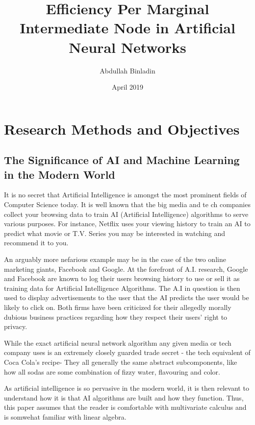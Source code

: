 \documentclass[12pt]{article}
\title{Efficiency Per Marginal Intermediate Node in Artificial Neural Networks}
\author{Abdullah Binladin}
\date{April 2019}
\begin{document}
\maketitle


\section{Research Methods and Objectives}

    \subsection{The Significance of AI and Machine Learning in the Modern World \label{history}}

        It is no secret that Artificial Intelligence is amongst the most prominent fields of Computer Science today. It is well known that the big media and te
        ch companies collect your browsing data to train AI (Artificial Intelligence) algorithms to serve various purposes. For instance, Netflix uses your viewing history to train an AI to predict what movie or T.V. Series you may be interested in watching and recommend it to you.

        An arguably more nefarious example may be in the case of the two online marketing giants, Facebook and Google. At the forefront of A.I. research, Google and Facebook are known to log their users browsing history to use or sell it as training data for Artificial Intelligence Algorithms. The A.I in question is then used to display advertisements to the user that the AI predicts the user would be likely to click on. Both firms have been criticized for their allegedly morally dubious business practices regarding how they respect their users' right to privacy.

        While the exact artificial neural network algorithm any given media or tech company uses is an extremely closely guarded trade secret - the tech equivalent of Coca Cola's recipe- They all generally the same abstract subcomponents, like how all sodas are some combination of fizzy water, flavouring and color.

        As artificial intelligence is so pervasive in the modern world, it is then relevant to understand how it is that AI algorithms are built and how they function. Thus, this paper assumes that the reader is comfortable with multivariate calculus and is somwehat familiar with linear algebra.
\end{document}
